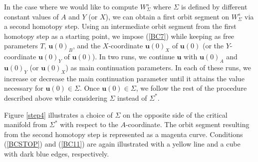 \documentclass{ws-ijbc}
\begin{document}
In the case where we would like to compute $W^{s}_{\Sigma}$ where $\Sigma$ is defined by different constant values of $A$ and $Y$ (or $X$), we can obtain a first orbit segment on $W^{s}_{\Sigma}$ via a second homotopy step.  Using an intermediate orbit segment from the first homotopy step as a starting point, we impose (\ref{BC7}) while keeping as free parameters $T$, $\mathbf{u}(0)_B$, and the $X$-coordinate $\mathbf{u}(0)_X$ of $\mathbf{u}(0)$ (or the $Y$-coordinate  $\mathbf{u}(0)_Y$ of $\mathbf{u}(0)$).  In two runs, we continue $\mathbf{u}$ with $\mathbf{u}(0)_A$ and $\mathbf{u}(0)_Y$ (or $\mathbf{u}(0)_X$) as main continuation parameters.  In each of these runs, we increase or decrease the main continuation parameter until it attains the value necessary for $\mathbf{u}(0) \in \Sigma$.  Once $\mathbf{u}(0) \in \Sigma$, we follow the rest of the procedure described above while considering $\Sigma$ instead of $\Sigma^*$.
    
Figure \ref{step4} illustrates a choice of $\Sigma$ on the opposite side of the critical manifold from $\Sigma^*$ with respect to the $A$-coordinate.  The orbit segment resulting from the second homotopy step is represented as a magenta curve.  Conditions (\ref{BCSTOP}) and (\ref{BC11}) are again illustrated with a yellow line and a cube with dark blue edges, respectively.
\end{document}
